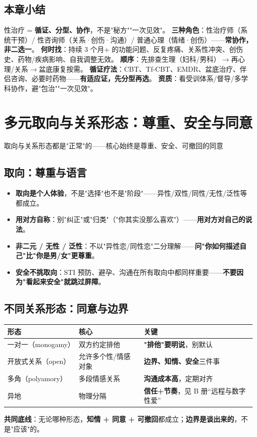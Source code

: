\documentclass[12pt,UTF8,openany]{ctexbook}
\begin{document}
\section{本章小结}
性治疗 = \textbf{循证、分型、协作}，不是"秘方""一次见效"。
\textbf{三种角色}：性治疗师（系统干预）/ 性咨询师（关系·创伤·沟通）/ 普通心理（情绪·创伤）——\textbf{常协作，非二选一}。
\textbf{何时找}：持续 3 个月+ 的功能问题、反复疼痛、关系性冲突、创伤史、药物/疾病影响、自我调整无效。
\textbf{顺序}：先排查生理（妇科/男科）$\to$再心理/关系$\to$盆底康复按需。
\textbf{循证疗法}：CBT、Tf-CBT、EMDR、盆底治疗、伴侣咨询、必要时药物——\textbf{有适应证，先分型再选}。
\textbf{资质}：看受训体系/督导/多学科协作，避"包治""一次见效"。


\chapter{多元取向与关系形态：尊重、安全与同意}

\begin{center}
\myhei\large 取向与关系形态都是"正常"的——核心始终是尊重、安全、可撤回的同意
\end{center}

\section{取向：尊重与语言}
\begin{itemize}[leftmargin=2em,itemsep=0.3em]
  \item \textbf{取向是个人体验}，不是"选择"也不是"阶段"——异性/双性/同性/无性/泛性等都成立。
  \item \textbf{用对方自称}：别"纠正"或"归类"（"你其实没那么喜欢"）——\textbf{用对方对自己的说法}。
  \item \textbf{非二元 / 无性 / 泛性}：不以"异性恋/同性恋"二分理解——\textbf{问"你如何描述自己"比"你是男/女"更尊重}。
  \item \textbf{安全不挑取向}：STI 预防、避孕、沟通在所有取向中都同样重要——\textbf{不要因为"看起来安全"就跳过屏障}。
\end{itemize}

\section{不同关系形态：同意与边界}
\begin{tabularx}{\textwidth}{X X X}
\toprule
\textbf{形态} & \textbf{核心} & \textbf{关键} \\
\midrule
一对一（monogamy） & 双方约定排他 & \textbf{"排他"要明说}，别默认 \\
开放式关系（open） & 允许多个性/情感对象 & \textbf{边界、知情、安全}三件事 \\
多角（polyamory） & 多段情感关系 & \textbf{沟通成本高}，定期对齐 \\
异地 & 物理分隔 & \textbf{信任+节奏}，见 B 册“远程与数字性爱” \\
\bottomrule
\end{tabularx}
\par\smallskip
\textbf{共同底线}：无论哪种形态，\textbf{知情 + 同意 + 可撤回}都成立；\textbf{边界是谈出来的}，不是"应该"的。
\end{document}
